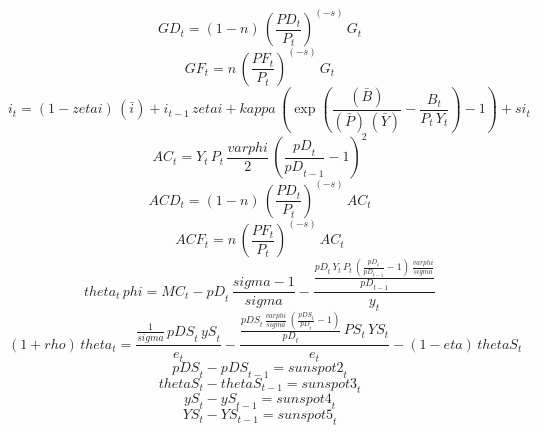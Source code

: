 \begin{dmath}
{GD}_{t}=\left(1-{n}\right)\, \left(\frac{{PD}_{t}}{{P}_{t}}\right)^{\left(-{s}\right)}\, {G}_{t}
\end{dmath}
\begin{dmath}
{GF}_{t}={n}\, \left(\frac{{PF}_{t}}{{P}_{t}}\right)^{\left(-{s}\right)}\, {G}_{t}
\end{dmath}
\begin{dmath}
{i}_{t}=\left(1-{zetai}\right)\, (\bar{i})+{i}_{t-1}\, {zetai}+{kappa}\, \left(\exp\left(\frac{(\bar{B})}{(\bar{P})\, (\bar{Y})}-\frac{{B}_{t}}{{P}_{t}\, {Y}_{t}}\right)-1\right)+{si}_{t}
\end{dmath}
\begin{dmath}
{AC}_{t}={Y}_{t}\, {P}_{t}\, \frac{{varphi}}{2}\, \left(\frac{{pD}_{t}}{{pD}_{t-1}}-1\right)^{2}
\end{dmath}
\begin{dmath}
{ACD}_{t}=\left(1-{n}\right)\, \left(\frac{{PD}_{t}}{{P}_{t}}\right)^{\left(-{s}\right)}\, {AC}_{t}
\end{dmath}
\begin{dmath}
{ACF}_{t}={n}\, \left(\frac{{PF}_{t}}{{P}_{t}}\right)^{\left(-{s}\right)}\, {AC}_{t}
\end{dmath}
\begin{dmath}
{theta}_{t}\, {phi}={MC}_{t}-{pD}_{t}\, \frac{{sigma}-1}{{sigma}}-\frac{\frac{{pD}_{t}\, {Y}_{t}\, {P}_{t}\, \left(\frac{{pD}_{t}}{{pD}_{t-1}}-1\right)\, \frac{{varphi}}{{sigma}}}{{pD}_{t-1}}}{{y}_{t}}
\end{dmath}
\begin{dmath}
\left(1+{rho}\right)\, {theta}_{t}=\frac{\frac{1}{{sigma}}\, {pDS}_{t}\, {yS}_{t}}{{e}_{t}}-\frac{\frac{{pDS}_{t}\, \frac{{varphi}}{{sigma}}\, \left(\frac{{pDS}_{t}}{{pD}_{t}}-1\right)}{{pD}_{t}}\, {PS}_{t}\, {YS}_{t}}{{e}_{t}}-\left(1-{eta}\right)\, {thetaS}_{t}
\end{dmath}
\begin{dmath}
{pDS}_{t}-{pDS}_{t-1}={sunspot2}_{t}
\end{dmath}
\begin{dmath}
{thetaS}_{t}-{thetaS}_{t-1}={sunspot3}_{t}
\end{dmath}
\begin{dmath}
{yS}_{t}-{yS}_{t-1}={sunspot4}_{t}
\end{dmath}
\begin{dmath}
{YS}_{t}-{YS}_{t-1}={sunspot5}_{t}
\end{dmath}
